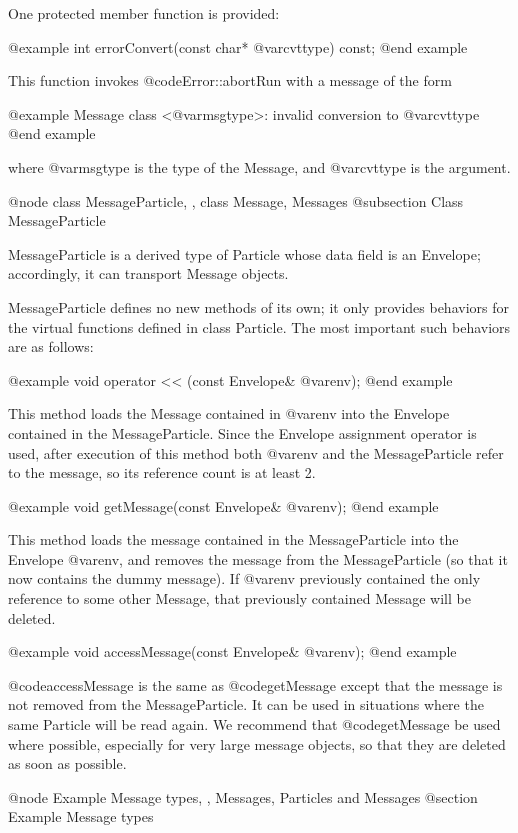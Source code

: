One protected member function is provided:

@example
int errorConvert(const char* @var{cvttype}) const;
@end example

This function invokes @code{Error::abortRun} with a message of the
form

@example
Message class <@var{msgtype}>: invalid conversion to @var{cvttype}
@end example

where @var{msgtype} is the type of the Message, and @var{cvttype} is
the argument.

@node class MessageParticle,  , class Message, Messages
@subsection Class MessageParticle

MessageParticle is a derived type of Particle whose data field is an
Envelope; accordingly, it can transport Message objects.

MessageParticle defines no new methods of its own; it only provides
behaviors for the virtual functions defined in class Particle.
The most important such behaviors are as follows:

@example
void operator << (const Envelope& @var{env});
@end example

This method loads the Message contained in @var{env} into the Envelope
contained in the MessageParticle.  Since the Envelope assignment
operator is used, after execution of this method both @var{env} and
the MessageParticle refer to the message, so its reference count is at
least 2.

@example
void getMessage(const Envelope& @var{env});
@end example

This method loads the message contained in the MessageParticle into the
Envelope @var{env}, and removes the message from the MessageParticle
(so that it now contains the dummy message).  If @var{env} previously
contained the only reference to some other Message, that previously
contained Message will be deleted.

@example
void accessMessage(const Envelope& @var{env});
@end example

@code{accessMessage} is the same as @code{getMessage} except that the
message is not removed from the MessageParticle.  It can be used in
situations where the same Particle will be read again.  We recommend
that @code{getMessage} be used where possible, especially for very
large message objects, so that they are deleted as soon as possible.

@node Example Message types,  , Messages, Particles and Messages
@section Example Message types

